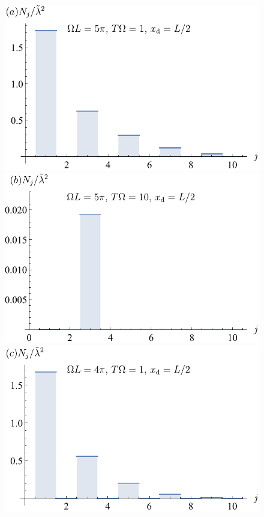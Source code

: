 \documentclass[11pt,prd,onecolumn,superscriptaddress,nofootinbib,floatfix,amsmath,amssymb]{revtex4-2}
\begin{document}
    \begin{figure}[tp]
        \includegraphics[scale=0.5]{Fig8a.pdf}
        \includegraphics[scale=0.5]{Fig8b.pdf}
        \includegraphics[scale=0.5]{Fig8c.pdf}

\end{figure}
\end{document}
